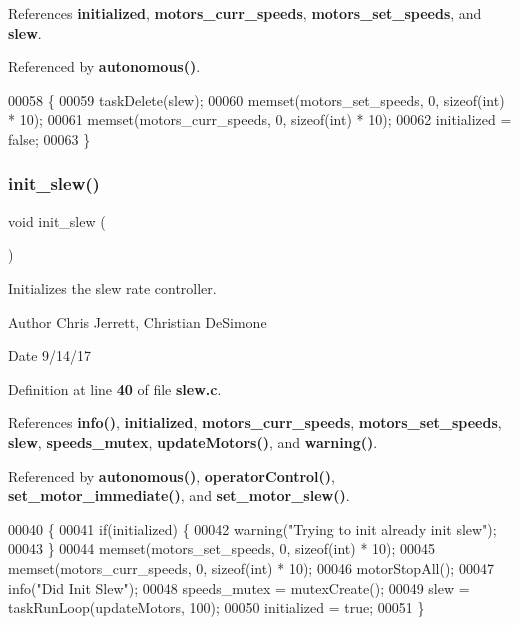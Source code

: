 References \textbf{ initialized}, \textbf{ motors\+\_\+curr\+\_\+speeds}, \textbf{ motors\+\_\+set\+\_\+speeds}, and \textbf{ slew}.



Referenced by \textbf{ autonomous()}.


\begin{DoxyCode}
00058                  \{
00059   taskDelete(slew);
00060   memset(motors_set_speeds, 0, \textcolor{keyword}{sizeof}(\textcolor{keywordtype}{int}) * 10);
00061   memset(motors_curr_speeds, 0, \textcolor{keyword}{sizeof}(\textcolor{keywordtype}{int}) * 10);
00062   initialized = \textcolor{keyword}{false};
00063 \}
\end{DoxyCode}
\mbox{\label{slew_8h_a321758941d88b75783955c819bb75005}} 
\subsubsection{init\+\_\+slew()}
{\footnotesize\ttfamily void init\+\_\+slew (\begin{DoxyParamCaption}{ }\end{DoxyParamCaption})}



Initializes the slew rate controller. 

\begin{DoxyAuthor}{Author}
Chris Jerrett, Christian De\+Simone 
\end{DoxyAuthor}
\begin{DoxyDate}{Date}
9/14/17 
\end{DoxyDate}


Definition at line \textbf{ 40} of file \textbf{ slew.\+c}.



References \textbf{ info()}, \textbf{ initialized}, \textbf{ motors\+\_\+curr\+\_\+speeds}, \textbf{ motors\+\_\+set\+\_\+speeds}, \textbf{ slew}, \textbf{ speeds\+\_\+mutex}, \textbf{ update\+Motors()}, and \textbf{ warning()}.



Referenced by \textbf{ autonomous()}, \textbf{ operator\+Control()}, \textbf{ set\+\_\+motor\+\_\+immediate()}, and \textbf{ set\+\_\+motor\+\_\+slew()}.


\begin{DoxyCode}
00040                 \{
00041   \textcolor{keywordflow}{if}(initialized) \{
00042     warning(\textcolor{stringliteral}{"Trying to init already init slew"});
00043   \}
00044   memset(motors_set_speeds, 0, \textcolor{keyword}{sizeof}(\textcolor{keywordtype}{int}) * 10);
00045   memset(motors_curr_speeds, 0, \textcolor{keyword}{sizeof}(\textcolor{keywordtype}{int}) * 10);
00046   motorStopAll();
00047   info(\textcolor{stringliteral}{"Did Init Slew"});
00048   speeds_mutex = mutexCreate();
00049   slew = taskRunLoop(updateMotors, 100);
00050   initialized = \textcolor{keyword}{true};
00051 \}
\end{DoxyCode}
\mbox{\label{slew_8h_a9f8b8ae577ef938622024545711f0151}} 
